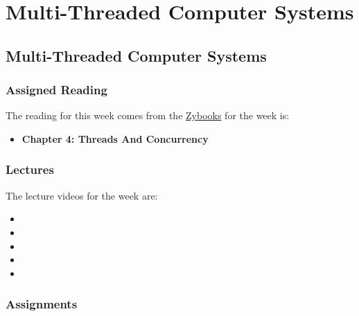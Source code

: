 \clearpage

\renewcommand{\ChapTitle}{Multi-Threaded Computer Systems}
\renewcommand{\SectionTitle}{Multi-Threaded Computer Systems}

\chapter{\ChapTitle}
\section{\SectionTitle}

\subsection{Assigned Reading}

The reading for this week comes from the \href{https://learn.zybooks.com/zybook/COLORADOCSPB3753KnoxFall2024}{Zybooks} for the week is:

\begin{itemize}
    \item \textbf{Chapter 4: Threads And Concurrency}
\end{itemize}

\subsection{Lectures}

The lecture videos for the week are:

\begin{itemize}
    \item {}
    \item {}
    \item {}
    \item {}
    \item {}
\end{itemize}

\subsection{Assignments}

